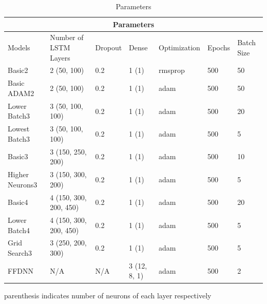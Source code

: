 \documentclass[10pt,11pt,12pt,oneside]{book}
\begin{document}
\begin{table}[H]
\centering
\begin{threeparttable}
\begin{tabular}{ |p{2cm}||p{2.5cm}|p{1.5cm}|p{1.5cm}| p{2.5cm} | p{1.5cm}| p{1.5cm} |   }
 \hline
 \multicolumn{7}{|c|}{Parameters} \\
 \hline
Models & Number of LSTM Layers & Dropout & Dense & Optimization & Epochs & Batch Size\\
 \hline
 Basic2 & 2 (50, 100) & 0.2 & 1 (1) & rmsprop & 500 & 50\\
 \hline
 Basic ADAM2 & 2 (50, 100) & 0.2 & 1 (1) & adam & 500 & 50\\
 \hline
 Lower Batch3 & 3 (50, 100, 100) & 0.2 & 1 (1) & adam & 500 & 20\\
 \hline
 Lowest Batch3 & 3 (50, 100, 100) & 0.2 & 1 (1) & adam & 500 & 5\\
 \hline
 Basic3 & 3 (150, 250, 200) & 0.2 & 1 (1) & adam & 500 & 10\\
 \hline
Higher Neurons3 & 3 (150, 300, 200) & 0.2 & 1 (1) & adam & 500 & 5\\
 \hline
 Basic4 & 4 (150, 300, 200, 450) & 0.2 & 1 (1) & adam & 500 & 20\\
 \hline
 Lower Batch4 & 4 (150, 300, 200, 450) & 0.2 & 1 (1) & adam & 500 & 5\\
 \hline
 Grid Search3 & 3 (250, 200, 300) & 0.2 & 1 (1) & adam & 500 & 5\\
  \hline
 FFDNN & N/A & N/A & 3 (12, 8, 1) & adam & 500 & 2\\
 \hline
\end{tabular}
\begin{tablenotes}
      \small
      \item parenthesis indicates number of neurons of each layer respectively
    \end{tablenotes}
\end{threeparttable}
\caption{Parameters}
\label{table:params}
\end{table}
\end{document}
